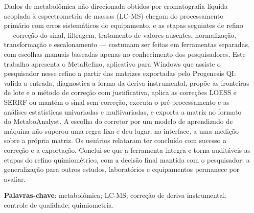 
\setlength{\absparsep}{18pt} %
\begin{resumo}[Resumo]

 Dados de metabolômica não direcionada obtidos por cromatografia líquida acoplada à espectrometria de massas (LC-MS) chegam do processamento primário com erros sistemáticos do equipamento, e as etapas seguintes de refino — correção do sinal, filtragem, tratamento de valores ausentes, normalização, transformação e escalonamento — costumam ser feitas em ferramentas separadas, com escolhas manuais baseadas apenas no conhecimento dos pesquisadores. Este trabalho apresenta o MetaRefino, aplicativo para Windows que assiste o pesquisador nesse refino a partir das matrizes exportadas pelo Progenesis QI: valida a entrada, diagnostica a forma da deriva instrumental, propõe as fronteiras de lote e o método de correção com justificativa, aplica as correções LOESS e SERRF ou mantém o sinal sem correção, executa o pré-processamento e as análises estatísticas univariadas e multivariadas, e exporta a matriz no formato do MetaboAnalyst. A escolha do corretor por um modelo de aprendizado de máquina não superou uma regra fixa e deu lugar, na interface, a uma medição sobre a própria matriz. Os usuários relataram ter concluído com sucesso a correção e a exportação. Conclui-se que a ferramenta integra e torna auditáveis as etapas do refino quimiométrico, com a decisão final mantida com o pesquisador; a generalização para outros estudos, laboratórios e equipamentos permanece por avaliar.

 \textbf{Palavras-chave}: metabolômica; LC-MS; correção de deriva instrumental; controle de qualidade; quimiometria.
\end{resumo}

